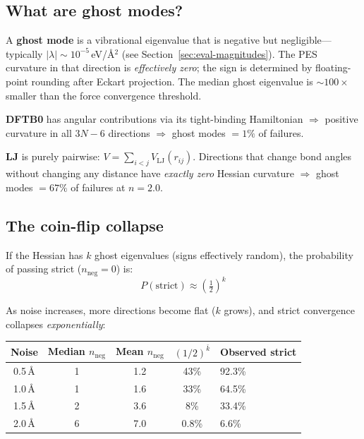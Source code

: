 \documentclass[11pt,a4paper]{article}
\theoremstyle{definition}
\begin{document}
\subsection{What are ghost modes?}

A \textbf{ghost mode} is a vibrational eigenvalue that is negative but
negligible---typically $|\lambda| \sim 10^{-5}$\,eV/\AA$^2$ (see
Section~\ref{sec:eval-magnitudes}).  The PES curvature in that direction
is \emph{effectively zero}; the sign is determined by floating-point
rounding after Eckart projection.  The median ghost eigenvalue is
${\sim}100\times$ smaller than the force convergence threshold.

\begin{tcolorbox}[warning, title=Root cause: LJ has no angular terms]
\textbf{DFTB0} has angular contributions via its tight-binding Hamiltonian
$\Rightarrow$ positive curvature in all $3N{-}6$ directions
$\Rightarrow$ ghost modes $= 1\%$ of failures.

\medskip

\textbf{LJ} is purely pairwise: $V = \sum_{i<j} V_\text{LJ}(r_{ij})$.
Directions that change bond angles without changing any distance have
\emph{exactly zero} Hessian curvature $\Rightarrow$ ghost modes $= 67\%$
of failures at $n{=}2.0$.
\end{tcolorbox}

\subsection{The coin-flip collapse}

If the Hessian has $k$ ghost eigenvalues (signs effectively random), the
probability of passing strict ($n_\text{neg}{=}0$) is:
\[
  P(\text{strict}) \approx \left(\tfrac{1}{2}\right)^k
\]

As noise increases, more directions become flat ($k$ grows), and strict
convergence collapses \emph{exponentially}:

\begin{center}
\begin{tabular}{ccccl}
\toprule
Noise & Median $n_\text{neg}$ & Mean $n_\text{neg}$ & $(1/2)^{\bar{k}}$ & Observed strict \\
\midrule
0.5\,\AA & 1 & 1.2 & 43\% & 92.3\% \\
1.0\,\AA & 1 & 1.6 & 33\% & 64.5\% \\
1.5\,\AA & 2 & 3.6 & 8\%  & 33.4\% \\
2.0\,\AA & 6 & 7.0 & 0.8\% & 6.6\%  \\
\bottomrule
\end{tabular}
\end{center}
\end{document}
